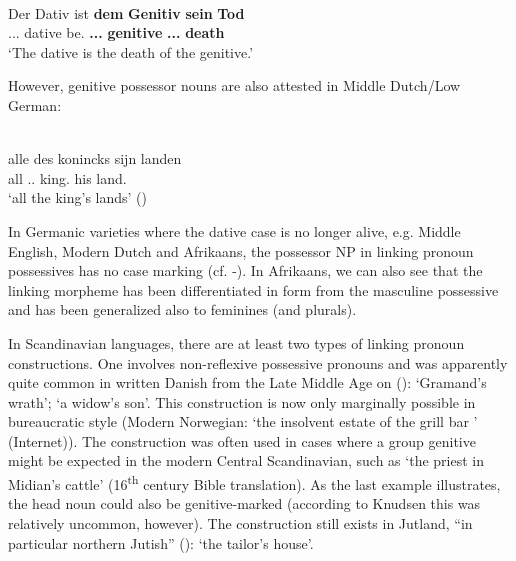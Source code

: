\ea%
\\
\gll Der  Dativ  ist  \textbf{dem} \textbf{Genitiv} \textbf{sein} \textbf{Tod}\\
{}.{\m}.{\sg}.{\nom}  dative  be.{\prs}  \textbf{{}.{\m}.{\sg}.{\dat}} \textbf{genitive} \textbf{{\poss}.{\m}.{\sg}.{\nom}} \textbf{death}\\
\glt  ‘The dative is the death of the genitive.’
\z

 However, genitive possessor nouns are also attested in Middle Dutch/Low German:

\ea%
\\
\gll alle  des  konincks  sijn  landen\\
all  {}.{\m}.{\gen}  king.{\gen}  his  land.{\pl}\\
\glt ‘all the king’s lands’ (\citealt[58]{Norde1997})
\z

In Germanic varieties where the dative case is no longer alive, e.g. Middle English, Modern Dutch and Afrikaans, the possessor NP in linking pronoun possessives has no case marking (cf. -). In Afrikaans, we can also see that the linking morpheme  has been differentiated in form from the masculine possessive  and has been generalized also to feminines (and plurals).

In Scandinavian languages, there are at least two types of linking pronoun constructions. One involves non-reflexive possessive pronouns and was apparently quite common in written Danish from the Late Middle Age on (\citealt[61]{Knudsen1941}): ‘Gramand’s wrath’;  ‘a widow’s son’. This construction is now only marginally possible in bureaucratic style (Modern Norwegian:  ‘the insolvent estate of the grill bar ’ (Internet)). The construction was often used in cases where a group genitive might be expected in the modern Central Scandinavian, such as  ‘the priest in Midian’s cattle’ (16\textsuperscript{th} century Bible translation). As the last example illustrates, the head noun could also be genitive-marked (according to Knudsen this was relatively uncommon, however). The construction still exists in Jutland, “in particular northern Jutish” (\citealt[62]{Knudsen1941}):  ‘the tailor’s house’.

